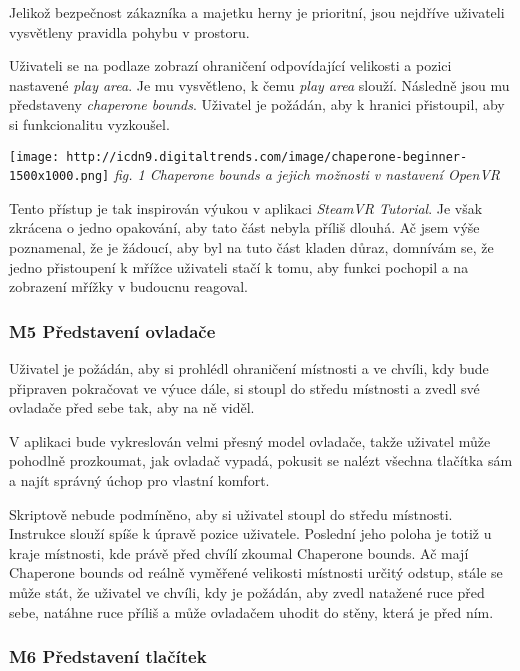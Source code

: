 Jelikož bezpečnost zákazníka a majetku herny je prioritní, jsou nejdříve
uživateli vysvětleny pravidla pohybu v prostoru.

Uživateli se na podlaze zobrazí ohraničení odpovídající velikosti a
pozici nastavené \emph{play area}. Je mu vysvětleno, k čemu \emph{play
area} slouží. Následně jsou mu představeny \emph{chaperone bounds}.
Uživatel je požádán, aby k hranici přistoupil, aby si funkcionalitu
vyzkoušel.

\texttt{[image: http://icdn9.digitaltrends.com/image/chaperone-beginner-1500x1000.png]}
\emph{fig. 1 Chaperone bounds a jejich možnosti v nastavení OpenVR}

Tento přístup je tak inspirován výukou v aplikaci \emph{SteamVR
Tutorial}. Je však zkrácena o jedno opakování, aby tato část nebyla
příliš dlouhá. Ač jsem výše poznamenal, že je žádoucí, aby byl na tuto
část kladen důraz, domnívám se, že jedno přistoupení k mřížce uživateli
stačí k tomu, aby funkci pochopil a na zobrazení mřížky v budoucnu
reagoval.

\subsubsection{M5 Představení
ovladače}\label{m5-pux159edstavenuxed-ovladaux10de}

Uživatel je požádán, aby si prohlédl ohraničení místnosti a ve chvíli,
kdy bude připraven pokračovat ve výuce dále, si stoupl do středu
místnosti a zvedl své ovladače před sebe tak, aby na ně viděl.

V aplikaci bude vykreslován velmi přesný model ovladače, takže uživatel
může pohodlně prozkoumat, jak ovladač vypadá, pokusit se nalézt všechna
tlačítka sám a najít správný úchop pro vlastní komfort.

Skriptově nebude podmíněno, aby si uživatel stoupl do středu místnosti.
Instrukce slouží spíše k úpravě pozice uživatele. Poslední jeho poloha
je totiž u kraje místnosti, kde právě před chvílí zkoumal Chaperone
bounds. Ač mají Chaperone bounds od reálně vyměřené velikosti místnosti
určitý odstup, stále se může stát, že uživatel ve chvíli, kdy je
požádán, aby zvedl natažené ruce před sebe, natáhne ruce příliš a může
ovladačem uhodit do stěny, která je před ním.

\subsubsection{M6 Představení
tlačítek}\label{m6-pux159edstavenuxed-tlaux10duxedtek}

